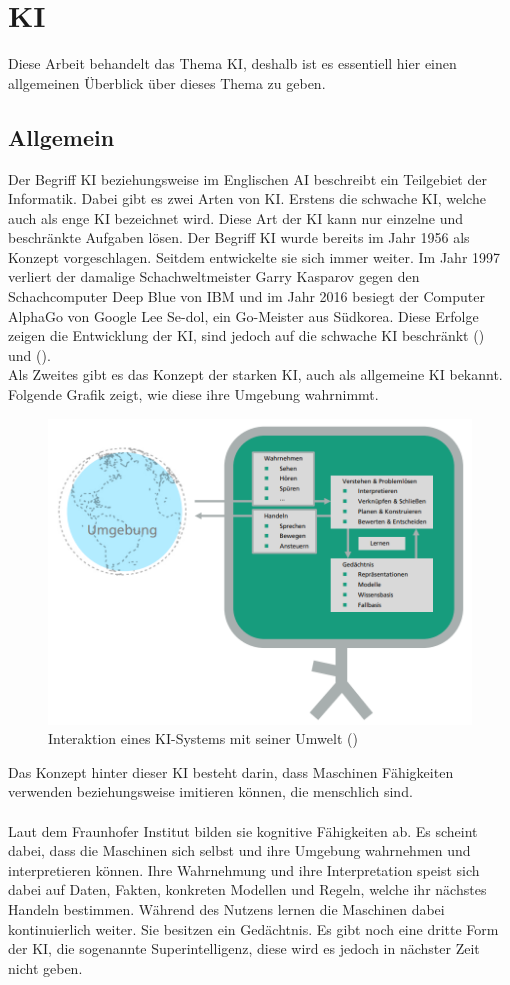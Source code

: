 \documentclass[12pt,toc=bib,toc=listof]{scrreprt}
\begin{document}
\section{KI} %
\label{sec:KI}
Diese Arbeit behandelt das Thema KI, deshalb ist es essentiell hier einen allgemeinen Überblick über dieses Thema zu geben.

\subsection{Allgemein} %
\label{sec:allgemein}
Der Begriff KI beziehungsweise im Englischen AI beschreibt ein Teilgebiet der Informatik. Dabei gibt es zwei Arten von KI. Erstens die schwache KI, welche auch als enge KI bezeichnet wird. Diese Art der KI kann nur einzelne und beschränkte Aufgaben lösen. Der Begriff KI wurde bereits im Jahr 1956 als Konzept vorgeschlagen. Seitdem entwickelte sie sich immer weiter. Im Jahr 1997 verliert der damalige Schachweltmeister Garry Kasparov gegen den Schachcomputer Deep Blue von IBM und im Jahr 2016 besiegt der Computer AlphaGo von Google Lee Se-dol, ein Go-Meister aus Südkorea. Diese Erfolge zeigen die Entwicklung der KI, sind jedoch auf die schwache KI beschränkt (\cite{Hecker2018}) und (\cite{Roscher2025}).\\
Als Zweites gibt es das Konzept der starken KI, auch als allgemeine KI bekannt. Folgende Grafik zeigt, wie diese ihre Umgebung wahrnimmt.
\begin{figure} [H]
    \centering
    \includegraphics[width=0.75\linewidth]{./Bilder/Fraunhofer_KI-Umgebung.png}
    \caption{Interaktion eines KI-Systems mit seiner Umwelt (\cite{Hecker2018})}
    \label{fig:enter-label}
\end{figure}
\noindent Das Konzept hinter dieser KI besteht darin, dass Maschinen Fähigkeiten verwenden beziehungsweise imitieren können, die menschlich sind.\\
\\
Laut dem Fraunhofer Institut bilden sie kognitive Fähigkeiten ab.
Es scheint dabei, dass die Maschinen sich selbst und ihre Umgebung wahrnehmen und interpretieren können. Ihre Wahrnehmung und ihre Interpretation speist sich dabei auf Daten, Fakten, konkreten Modellen und Regeln, welche ihr nächstes Handeln bestimmen. Während des Nutzens lernen die Maschinen dabei kontinuierlich weiter. Sie besitzen ein Gedächtnis. Es gibt noch eine dritte Form der KI, die sogenannte Superintelligenz, diese wird es jedoch in nächster Zeit nicht geben.
\end{document}
